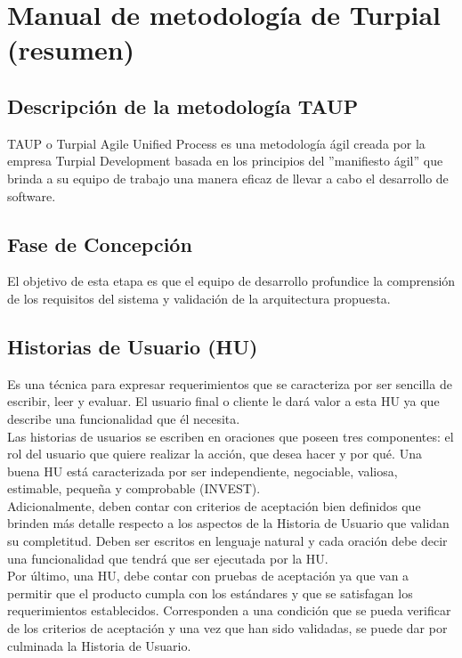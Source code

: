 \chapter{Manual de metodología de Turpial (resumen)}

\section*{Descripción de la metodología TAUP}

TAUP o Turpial Agile Unified Process es una metodología ágil creada por la empresa Turpial Development basada en los principios del ”manifiesto ágil” que brinda a su equipo de trabajo una manera eficaz de llevar a cabo el desarrollo de software.

\section*{Fase de Concepción}

El objetivo de esta etapa es que el equipo de desarrollo profundice la comprensión de los requisitos del sistema y validación de la arquitectura propuesta. 

\section*{Historias de Usuario (HU)}

Es una técnica para expresar requerimientos que se caracteriza por ser sencilla de escribir, leer y evaluar. El usuario final o cliente le dará valor a esta HU ya que describe una funcionalidad que él necesita.\\

Las historias de usuarios se escriben en oraciones que poseen tres componentes: el rol del usuario que quiere realizar la acción, que desea hacer y por qué. Una buena HU está caracterizada por ser independiente, negociable, valiosa, estimable, pequeña y comprobable (INVEST).\\

Adicionalmente, deben contar con criterios de aceptación bien definidos que brinden más detalle respecto a los aspectos de la Historia de Usuario que validan su completitud. Deben ser escritos en lenguaje natural y cada oración debe decir una funcionalidad que tendrá que ser ejecutada por la HU.\\

Por último, una HU, debe contar con pruebas de aceptación ya que van a permitir que el producto cumpla con los estándares y que se satisfagan los requerimientos establecidos. Corresponden a una condición que se pueda verificar de los criterios de aceptación y una vez que han sido validadas, se puede dar por culminada la Historia de Usuario.

